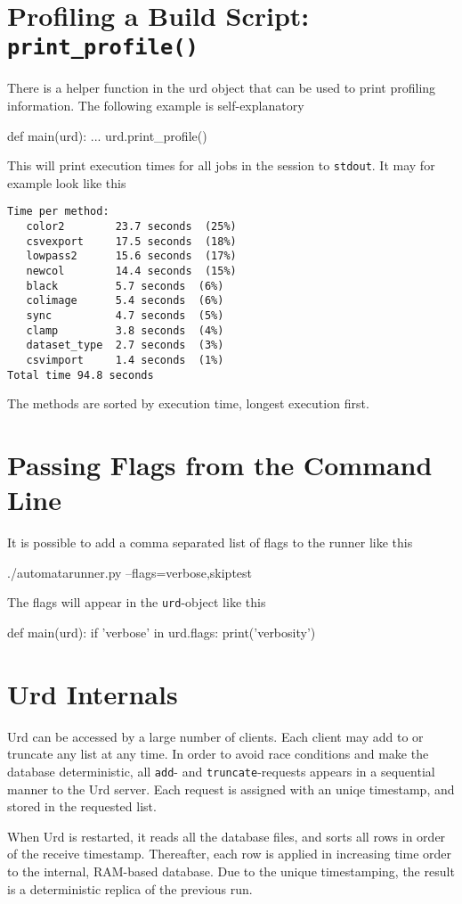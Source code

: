 \section{Profiling a Build Script:  \texttt{print\_profile()}}
There is a helper function in the urd object that can be used to print
profiling information.  The following example is self-explanatory
\begin{python}
def main(urd):
    ...
    urd.print_profile()
\end{python}
This will print execution times for all jobs in the session
to \texttt{stdout}.  It may for example look like this
\begin{verbatim}
Time per method:
   color2        23.7 seconds  (25%)
   csvexport     17.5 seconds  (18%)
   lowpass2      15.6 seconds  (17%)
   newcol        14.4 seconds  (15%)
   black         5.7 seconds  (6%)
   colimage      5.4 seconds  (6%)
   sync          4.7 seconds  (5%)
   clamp         3.8 seconds  (4%)
   dataset_type  2.7 seconds  (3%)
   csvimport     1.4 seconds  (1%)
Total time 94.8 seconds
\end{verbatim}
The methods are sorted by execution time, longest execution first.


\section{Passing Flags from the Command Line}
It is possible to add a comma separated list of flags to the runner
like this
\begin{python}
./automatarunner.py --flags=verbose,skiptest
\end{python}
The flags will appear in the \texttt{urd}-object like this
\begin{python}
def main(urd):
    if 'verbose' in urd.flags:
       print('verbosity')
\end{python}


\clearpage
\section{Urd Internals}
Urd can be accessed by a large number of clients.  Each client may add
to or truncate any list at any time.  In order to avoid race
conditions and make the database deterministic, all \texttt{add}-
and \texttt{truncate}-requests appears in a sequential manner to the
Urd server.  Each request is assigned with an uniqe timestamp, and
stored in the requested list.

When Urd is restarted, it reads all the database files, and sorts all
rows in order of the receive timestamp.  Thereafter, each row is
applied in increasing time order to the internal, RAM-based database.
Due to the unique timestamping, the result is a deterministic replica
of the previous run.
